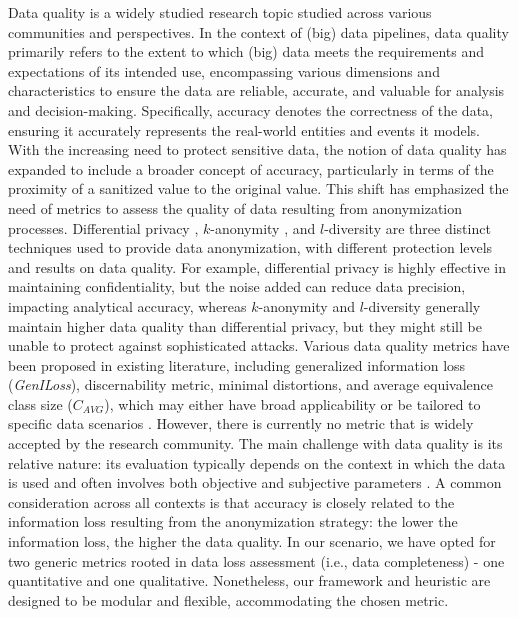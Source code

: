 Data quality is a widely studied research topic studied across various communities and perspectives. In the context of (big) data pipelines, data quality primarily refers to the extent to which (big) data meets the requirements and expectations of its intended use, encompassing various dimensions and characteristics to ensure the data are reliable, accurate, and valuable for analysis and decision-making. Specifically, accuracy denotes the correctness of the data, ensuring it accurately represents the real-world entities and events it models.
    {\color{OurColor}
        With the increasing need to protect sensitive data, the notion of data quality has expanded to include a broader concept of accuracy, particularly in terms of the proximity of a sanitized value to the original value.
        This shift has emphasized the need of metrics to assess the quality of data resulting from anonymization processes.
        Differential privacy \cite{dwork2008differential}, $k$-anonymity \cite{k-anon}, and $l$-diversity \cite{l-diversity} are three distinct techniques used to provide data anonymization, with different protection levels and results on data quality. For example, differential privacy is highly effective in maintaining confidentiality, but the noise added can reduce data precision, impacting analytical accuracy, whereas $k$-anonymity and $l$-diversity generally maintain higher data quality than differential privacy, but they might still be unable to protect against sophisticated attacks.
    }
Various data quality metrics have been proposed in existing literature, including generalized information loss (\textit{GenILoss}), discernability metric, minimal distortions, and average equivalence class size ($C_{AVG}$), which may either have broad applicability or be tailored to specific data scenarios \cite{Majeed2021AnonymizationTF,bookMetrics,reviewMetrics}. However, there is currently no metric that is widely accepted by the research community. The main challenge with data quality is its relative nature: its evaluation typically depends on the context in which the data is used and often involves both objective and subjective parameters \cite{dataAccuracy,dataQuality}.
%
A common consideration across all contexts is that accuracy is closely related to the information loss resulting from the anonymization strategy: the lower the information loss, the higher the data quality. In our scenario, we have opted for two generic metrics rooted in data loss assessment (i.e., data completeness) - one quantitative and one qualitative. Nonetheless, our framework and heuristic are designed to be modular and flexible, accommodating the chosen metric.

